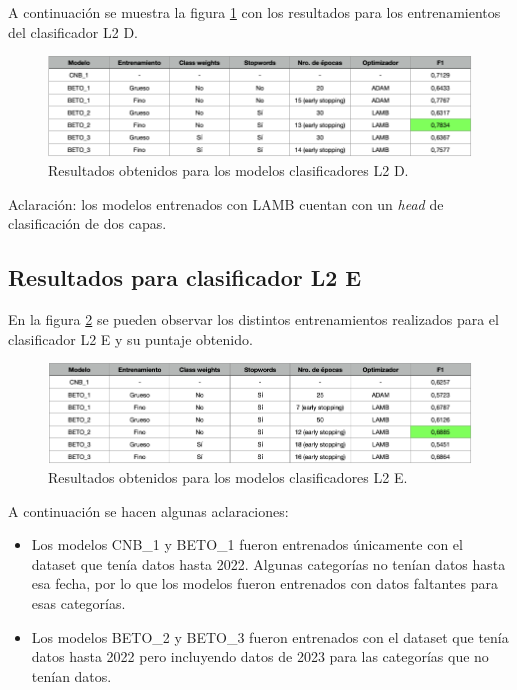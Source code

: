 A continuación se muestra la figura \ref{fig:res-l2d} con los resultados para los entrenamientos del clasificador L2 D.

\begin{figure}[htbp]
	\centering
	\includegraphics[width=1\textwidth]{./Figures/cap4-resultados-l2d.png}
	\caption{Resultados obtenidos para los modelos clasificadores L2 D.}
	\label{fig:res-l2d}
\end{figure}

Aclaración: los modelos entrenados con LAMB cuentan con un \textit{head} de clasificación de dos capas.

\subsection{Resultados para clasificador L2 E}

En la figura \ref{fig:res-l2e} se pueden observar los distintos entrenamientos realizados para el clasificador L2 E y su puntaje obtenido.

\begin{figure}[htbp]
	\centering
	\includegraphics[width=1\textwidth]{./Figures/cap4-resultados-l2e.png}
	\caption{Resultados obtenidos para los modelos clasificadores L2 E.}
	\label{fig:res-l2e}
\end{figure}

A continuación se hacen algunas aclaraciones:
\begin{itemize}
	\item Los modelos CNB\_1 y BETO\_1 fueron entrenados únicamente con el dataset que tenía datos hasta 2022. Algunas categorías no tenían datos hasta esa fecha, por lo que los modelos fueron entrenados con datos faltantes para esas categorías.
	\item Los modelos BETO\_2 y BETO\_3 fueron entrenados con el dataset que tenía datos hasta 2022 pero incluyendo datos de 2023 para las categorías que no tenían datos.
\end{itemize}

